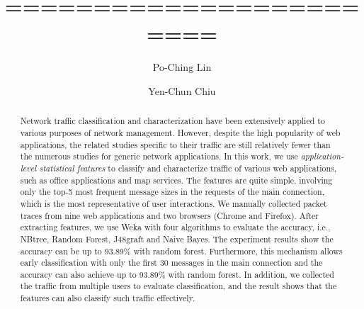 \documentclass[preprint,12pt]{elsarticle}
\begin{document}
\begin{frontmatter}



\title{========================}


\author{Po-Ching Lin}

\author{Yen-Chun Chiu}
\address{Department of Computer Science and Information Engineering,\\ National Chung Cheng University\\ 168 University Road, Minhsiung Township, Chiayi County 62102, Taiwan \\ Tel: +886-5-2720411 ext. 33113, Fax: +886-5-2720859}


\begin{abstract}
Network traffic classification and characterization have been extensively applied to various purposes of network management. However, despite the high popularity of web applications, the related studies specific to their traffic are still relatively fewer than the numerous studies for generic network applications. In this work, we use \emph{application-level statistical features} to classify and characterize traffic of various web applications, such as office applications and map services. The features are quite simple, involving only the top-5 most frequent message sizes in the requests of the main connection, which is the most representative of user interactions. We manually collected packet traces from nine web applications and two browsers (Chrome and Firefox). After extracting features, we use Weka with four algorithms to evaluate the accuracy, i.e., NBtree, Random Forest, J48graft and Naive Bayes. The experiment results show the accuracy can be up to 93.89\% with random forest. Furthermore, this mechanism allows early classification with only the first 30 messages in the main connection and the accuracy can also achieve up to 93.89\% with random forest. In addition, we collected the traffic from multiple users to evaluate classification, and the result shows that the features can also classify such traffic effectively.
\end{abstract}


\end{frontmatter}
\end{document}
